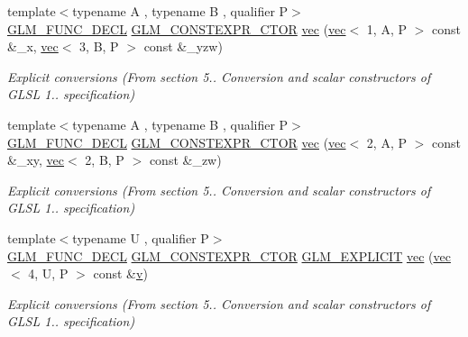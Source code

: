 \begin{DoxyCompactItemize}
{\footnotesize template$<$typename A , typename B , qualifier P$>$ }\\\mbox{\hyperlink{setup_8hpp_ab2d052de21a70539923e9bcbf6e83a51}{G\+L\+M\+\_\+\+F\+U\+N\+C\+\_\+\+D\+E\+CL}} \mbox{\hyperlink{setup_8hpp_ad34178a09666081abdb573c14d1f4a5a}{G\+L\+M\+\_\+\+C\+O\+N\+S\+T\+E\+X\+P\+R\+\_\+\+C\+T\+OR}} \mbox{\hyperlink{structglm_1_1vec_3_014_00_01_t_00_01_q_01_4_a307578dc6d0a7ff71643918d29ddcaa8}{vec}} (\mbox{\hyperlink{structglm_1_1vec}{vec}}$<$ 1, A, P $>$ const \&\+\_\+x, \mbox{\hyperlink{structglm_1_1vec}{vec}}$<$ 3, B, P $>$ const \&\+\_\+yzw)
\begin{DoxyCompactList}\small\item\em Explicit conversions (From section 5.. Conversion and scalar constructors of G\+L\+SL 1.. specification) \end{DoxyCompactList}\item 
{\footnotesize template$<$typename A , typename B , qualifier P$>$ }\\\mbox{\hyperlink{setup_8hpp_ab2d052de21a70539923e9bcbf6e83a51}{G\+L\+M\+\_\+\+F\+U\+N\+C\+\_\+\+D\+E\+CL}} \mbox{\hyperlink{setup_8hpp_ad34178a09666081abdb573c14d1f4a5a}{G\+L\+M\+\_\+\+C\+O\+N\+S\+T\+E\+X\+P\+R\+\_\+\+C\+T\+OR}} \mbox{\hyperlink{structglm_1_1vec_3_014_00_01_t_00_01_q_01_4_af18e05d8f9e28ed3dab7cd8b2150fede}{vec}} (\mbox{\hyperlink{structglm_1_1vec}{vec}}$<$ 2, A, P $>$ const \&\+\_\+xy, \mbox{\hyperlink{structglm_1_1vec}{vec}}$<$ 2, B, P $>$ const \&\+\_\+zw)
\begin{DoxyCompactList}\small\item\em Explicit conversions (From section 5.. Conversion and scalar constructors of G\+L\+SL 1.. specification) \end{DoxyCompactList}\item 
{\footnotesize template$<$typename U , qualifier P$>$ }\\\mbox{\hyperlink{setup_8hpp_ab2d052de21a70539923e9bcbf6e83a51}{G\+L\+M\+\_\+\+F\+U\+N\+C\+\_\+\+D\+E\+CL}} \mbox{\hyperlink{setup_8hpp_ad34178a09666081abdb573c14d1f4a5a}{G\+L\+M\+\_\+\+C\+O\+N\+S\+T\+E\+X\+P\+R\+\_\+\+C\+T\+OR}} \mbox{\hyperlink{setup_8hpp_a6c74f5a5e7b134ab69023ff9a30d4d5d}{G\+L\+M\+\_\+\+E\+X\+P\+L\+I\+C\+IT}} \mbox{\hyperlink{structglm_1_1vec_3_014_00_01_t_00_01_q_01_4_ad1532b19e40e767e98e2ca54aef6a6f4}{vec}} (\mbox{\hyperlink{structglm_1_1vec}{vec}}$<$ 4, U, P $>$ const \&\mbox{\hyperlink{_s_d_l__opengl_8h_a10a82eabcb59d2fcd74acee063775f90}{v}})
\begin{DoxyCompactList}\small\item\em Explicit conversions (From section 5.. Conversion and scalar constructors of G\+L\+SL 1.. specification) \end{DoxyCompactList}\item 

\end{DoxyCompactItemize}
